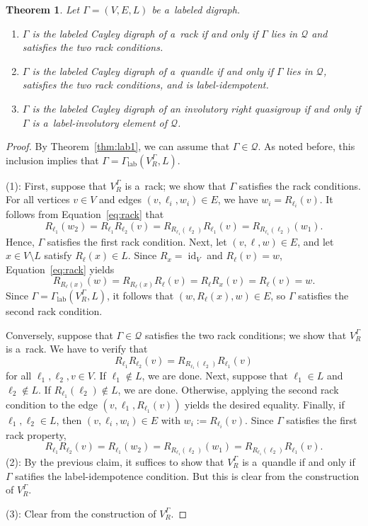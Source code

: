 \documentclass[10pt,a4paper]{amsart}
\newtheorem{theorem}{Theorem}
\DeclareMathOperator{\id}{id}
\DeclareMathOperator{\lab}{lab}
\begin{document}
	\begin{theorem}\label{thm:lab2}
		Let $\Gamma=(V,E,L)$ be a~labeled digraph.
		\begin{enumerate}
			\item $\Gamma$ is the labeled Cayley digraph of a~rack if and only if $\Gamma$ lies in $ \mathcal{Q}$ and satisfies the two rack conditions.
			\item $\Gamma$ is the labeled Cayley digraph of a~quandle if and only if $\Gamma$ lies in $ \mathcal{Q}$, satisfies the two rack conditions, and is label-idempotent.
			\item $\Gamma$ is the labeled Cayley digraph of an involutory right quasigroup if and only if $\Gamma$ is a~label-involutory element of $ \mathcal{Q}$.
		\end{enumerate}
	\end{theorem}

	\begin{proof}
		By Theorem~\ref{thm:lab1}, we can assume that $\Gamma\in\mathcal{Q}$. As noted before, this inclusion implies that $\Gamma=\Gamma_{\lab}(V^\Gamma_R,L)$.

		(1): First, suppose that $V^\Gamma_R$ is a~rack; we show that $\Gamma$ satisfies the rack conditions. For all vertices $v\in V$ and edges ${(v,\ell_i,w_i )\in E}$, we have $w_i =R_{\ell_i}(v)$. It follows from Equation~\eqref{eq:rack} that
		\[
			R_{\ell_1}(w_2)=R_{\ell_1}R_{\ell_2}(v)=R_{R_{\ell_1}(\ell_2)}R_{\ell_1}(v)=R_{R_{\ell_1}(\ell_2)}(w_1).
		\]
		Hence, $\Gamma$ satisfies the first rack condition. Next, let $(v,\ell,w)\in E$, and let $x\in V\setminus L$ satisfy $R_\ell(x)\in L$. Since $R_x =\id_V$ and $R_\ell(v)=w$, Equation~\eqref{eq:rack} yields
		\[
			R_{R_\ell(x)}(w)
            = R_{R_\ell(x)}R_\ell(v)
            = R_\ell R_x(v)
            = R_\ell(v)
            = w.
		\]
		Since $\Gamma=\Gamma_{\lab}(V^\Gamma_R,L)$, it follows that $(w,R_{\ell}(x),w)\in E$, so $\Gamma$ satisfies the second rack condition.

		Conversely, suppose that $\Gamma\in \mathcal{Q}$ satisfies the two rack conditions; we show that $V^\Gamma_R$ is a~rack. We have to verify that
		\begin{equation*}
			R_{\ell_1}R_{\ell_2}(v)=R_{R_{\ell_1}(\ell_2 )}R_{\ell_1}(v)
		\end{equation*}
		for all $\ell_1,\ell_2,v\in V$. If $\ell_1\notin L$, we are done. Next, suppose that $\ell_1\in L$ and $\ell_2\notin L$. If $R_{\ell_1}(\ell_2 )\notin L$, we are done. Otherwise, applying the second rack condition to the edge $(v,\ell_1,R_{\ell_1}(v))$ yields the desired equality. Finally, if $\ell_1,\ell_2\in L$, then $(v,\ell_i,w_i )\in E$ with $w_i:=R_{\ell_i}(v)$. Since $\Gamma$ satisfies the first rack property,
		\[
			R_{\ell_1}R_{\ell_2}(v)=R_{\ell_1}(w_2)=R_{R_{\ell_1}(\ell_2)}(w_1)=R_{R_{\ell_1}(\ell_2)}R_{\ell_1}(v).
		\]
		(2): By the previous claim, it suffices to show that $V^\Gamma_R$ is a~quandle if and only if $\Gamma$ satifies the label-idempotence condition. But this is clear from the construction of $V^\Gamma_R$.

		(3): Clear from the construction of $V^\Gamma_R$.
	\end{proof}
\end{document}
